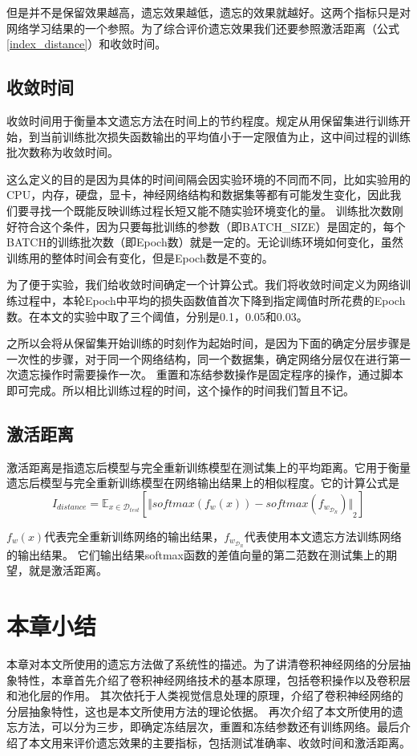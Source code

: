 但是并不是保留效果越高，遗忘效果越低，遗忘的效果就越好。这两个指标只是对网络学习结果的一个参照。为了综合评价遗忘效果我们还要参照激活距离（公式\ref{index_distance}）和收敛时间。

\subsection{收敛时间}

收敛时间用于衡量本文遗忘方法在时间上的节约程度。规定从用保留集进行训练开始，到当前训练批次损失函数输出的平均值小于一定限值为止，这中间过程的训练批次数称为收敛时间。

这么定义的目的是因为具体的时间间隔会因实验环境的不同而不同，比如实验用的CPU，内存，硬盘，显卡，神经网络结构和数据集等都有可能发生变化，因此我们要寻找一个既能反映训练过程长短又能不随实验环境变化的量。
训练批次数刚好符合这个条件，因为只要每批训练的参数（即BATCH\_SIZE）是固定的，每个BATCH的训练批次数（即Epoch数）就是一定的。无论训练环境如何变化，虽然训练用的整体时间会有变化，但是Epoch数是不变的。

为了便于实验，我们给收敛时间确定一个计算公式。我们将收敛时间定义为网络训练过程中，本轮Epoch中平均的损失函数值首次下降到指定阈值时所花费的Epoch数。在本文的实验中取了三个阈值，分别是0.1，0.05和0.03。

之所以会将从保留集开始训练的时刻作为起始时间，是因为下面的确定分层步骤是一次性的步骤，对于同一个网络结构，同一个数据集，确定网络分层仅在进行第一次遗忘操作时需要操作一次。
重置和冻结参数操作是固定程序的操作，通过脚本即可完成。所以相比训练过程的时间，这个操作的时间我们暂且不记。

\subsection{激活距离}

激活距离是指遗忘后模型与完全重新训练模型在测试集上的平均距离。它用于衡量遗忘后模型与完全重新训练模型在网络输出结果上的相似程度。它的计算公式是
\begin{equation}
I_{distance} = {\mathbb{E}}_{x\in {\mathcal{D}_{test}}}[{\Vert softmax(f_w(x)) - softmax(f_{w_{\mathcal{D}_R}}) \Vert}_2 ] \label{index_distance}
\end{equation}

$f_w(x)$代表完全重新训练网络的输出结果，$f_{w_{\mathcal{D}_R}}$代表使用本文遗忘方法训练网络的输出结果。
它们输出结果softmax函数的差值向量的第二范数在测试集上的期望，就是激活距离。


\section{本章小结}
本章对本文所使用的遗忘方法做了系统性的描述。为了讲清卷积神经网络的分层抽象特性，本章首先介绍了卷积神经网络技术的基本原理，包括卷积操作以及卷积层和池化层的作用。
其次依托于人类视觉信息处理的原理，介绍了卷积神经网络的分层抽象特性，这也是本文所使用方法的理论依据。
再次介绍了本文所使用的遗忘方法，可以分为三步，即确定冻结层次，重置和冻结参数还有训练网络。最后介绍了本文用来评价遗忘效果的主要指标，包括测试准确率、收敛时间和激活距离。
